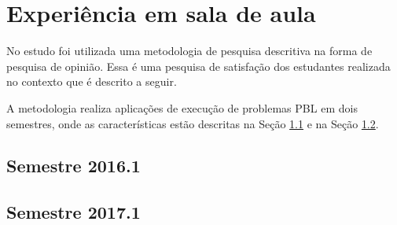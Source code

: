 \section{Experiência em sala de aula}
\label{sec-experiencia}

No estudo foi utilizada uma metodologia de pesquisa descritiva na forma
de pesquisa de opinião.
Essa é uma pesquisa de satisfação dos estudantes
realizada no contexto que é descrito a seguir.

A metodologia realiza aplicações de execução de problemas
\ac{PBL} em dois semestres, onde as características
estão descritas na Seção \ref{sec-exp-2016} e na Seção \ref{sec-exp-2017}.



\subsection{Semestre 2016.1}
\label{sec-exp-2016}

\subsection{Semestre 2017.1}
\label{sec-exp-2017}
